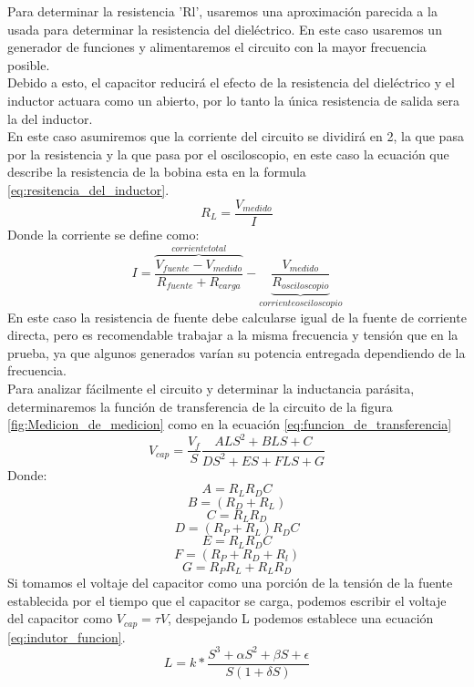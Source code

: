 \documentclass[journal]{IEEEtran}
\begin{document}
  Para determinar la resistencia 'Rl', usaremos una aproximación parecida a la usada para determinar la resistencia del dieléctrico. En este caso usaremos un generador de funciones y alimentaremos el circuito con la mayor frecuencia posible.\\Debido a esto, el capacitor reducirá el efecto de la resistencia del dieléctrico y el inductor actuara como un abierto, por lo tanto la única resistencia de salida sera la del inductor.\\ En este caso asumiremos que la corriente del circuito se dividirá en 2, la que pasa por la resistencia y la que pasa por el osciloscopio, en este caso la ecuación que describe la resistencia de la bobina esta en la formula \ref{eq:resitencia_del_inductor}.
  \begin{equation}
  \label{eq:resitencia_del_inductor}
  R_{L}=\frac{V_{medido}}{I}
  \end{equation}
  Donde la corriente se define como:\\
  \[I=\overbrace{\frac{V_{fuente}-V_{medido}}{R_{fuente}+R_{carga}}}^{corriente total}-\underbrace{\frac{V_{medido}}{R_{osciloscopio}}}_{corriente osciloscopio}\]
  En este caso la resistencia de fuente debe calcularse igual de la fuente de corriente directa, pero es recomendable trabajar a la misma frecuencia y tensión que en la prueba, ya que algunos generados varían su potencia entregada dependiendo de la frecuencia.\\ 
  Para analizar fácilmente el circuito y determinar la inductancia parásita, determinaremos la función de transferencia de la circuito de la figura \ref{fig:Medicion_de_medicion} como en la ecuación \ref{eq:funcion_de_transferencia} 
  \begin{equation}
  \label{eq:funcion_de_transferencia}
  V_{cap}=\frac{V_{f}}{S}\frac{ALS^{2}+BLS+C}{DS^{2}+ES+FLS+G}
  \end{equation}
  Donde:\\
  \[A=R_{L}R_DC\]
  \[B=(R_D+R_L)\]
  \[C=R_LR_D\]
  \[D=(R_P+R_L)R_DC\]
  \[E=R_LR_DC\]
  \[F=(R_P+R_D+R_l)\]
  \[G=R_PR_L+R_LR_D\]
  Si tomamos el voltaje del capacitor como una porción de la tensión de la fuente establecida por el tiempo que el capacitor se carga, podemos escribir el voltaje del capacitor como \(V_{cap}=\tau V\), despejando L podemos establece una ecuación \ref{eq:indutor_funcion}. 
  \begin{equation}
  \label{eq:indutor_funcion}
  L=k*\frac{S^{3}+\alpha S^{2}+\beta S+\epsilon }{S(1+\delta S)}
  \end{equation}
\end{document}
